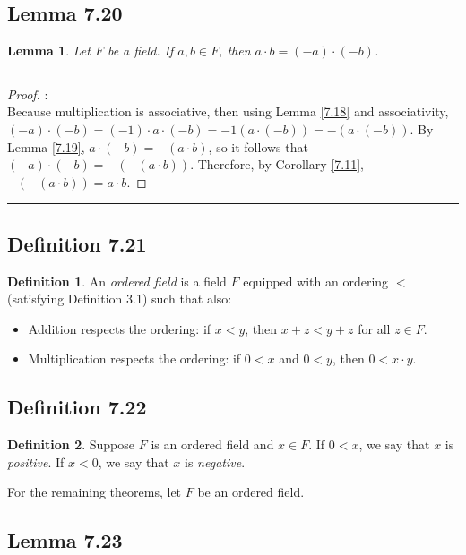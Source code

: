 \documentclass[openany, amssymb, psamsfonts]{amsart}
\newtheorem{lem}{Lemma}[section]
\theoremstyle{definition}
\newtheorem{defn}{Definition}[section]
\numberwithin{equation}{section}
\begin{document}
\subsection*{Lemma 7.20}
\begin{lem}
\label{7.20}
	Let $F$ be a field. If $a, b\in F$, then $a\cdot b=(-a)\cdot (-b)$.
\end{lem}
\vspace{4pt}     \hrule   \vspace{4pt}
\begin{proof}:\\
Because multiplication is associative, then using Lemma \ref{7.18} and associativity, $(-a) \cdot (-b) = (-1)\cdot a \cdot (-b) = -1(a\cdot (-b)) = -(a\cdot (-b))$. By Lemma \ref{7.19}, $a\cdot (-b) = -(a\cdot b)$, so it follows that $(-a) \cdot (-b) = -(-(a\cdot b))$. Therefore, by Corollary \ref{7.11}, $-(-(a\cdot b)) = a\cdot b$. 
\end{proof}
\vspace{4pt}     \hrule   \vspace{4pt}

\subsection*{Definition 7.21}
\begin{defn}
\label{7.21}
	An \emph{ordered field} is a field $F$ equipped with an ordering $<$ (satisfying Definition 3.1) such that also:
	\begin{itemize}
		\item  Addition respects the ordering: if $x < y$, then $x + z < y + z$ for all $z \in F$.
		\item  Multiplication respects the ordering: if $0 < x$ and $0 < y$, then $0 < x \cdot y$.
	\end{itemize}
\end{defn}

\subsection*{Definition 7.22}
\begin{defn}
\label{7.22}
	Suppose $F$ is an ordered field and $x\in F$.  If $0 < x$, we say that $x$ is \emph{positive}. If $x < 0$, we say that $x$ is \emph{negative}.
\end{defn}
For the remaining theorems, let $F$ be an ordered field.
\subsection*{Lemma 7.23}
\end{document}
